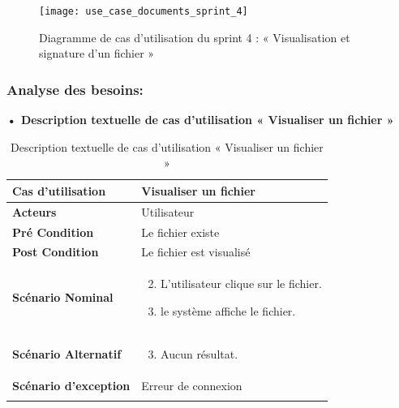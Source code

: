 \begin{figure}[H]
  \centering
  \texttt{[image: use\_case\_documents\_sprint\_4]}
  \caption{Diagramme de cas d'utilisation du sprint 4 : « Visualisation et signature d'un fichier »}
  \label{fig:UseCaseDiagram4}
\end{figure}
\subsubsection{Analyse des besoins:}
\textbf{•	Description textuelle de cas d'utilisation « Visualiser un fichier  »}
\begin{longtable}{|p{5cm}|p{10cm}|}
\hline
\textbf{Cas d'utilisation}&Visualiser un fichier\\
\hline
\textbf{Acteurs}&Utilisateur\\
\hline
\textbf{Pré Condition}&Le fichier existe\\
\hline
\textbf{Post Condition}&Le fichier est visualisé\\
\hline
\textbf{Scénario Nominal}&
\vspace{-\baselineskip}
\begin{enumerate}
    \setcounter{enumi}{1}
  \item L'utilisateur clique sur le fichier.
  \item le système affiche le fichier.
\end{enumerate}\\
\hline
\textbf{Scénario Alternatif}&
\vspace{-\baselineskip}
\begin{enumerate}
    \setcounter{enumi}{2}
    \item Aucun résultat.
\end{enumerate}\\
\hline
\textbf{Scénario d'exception}&Erreur de connexion\\
\hline
\caption{Description textuelle de cas d'utilisation « Visualiser un fichier  »}
\label{tab:description-textuelle-de-cas-d-utilisation-visualiser-un-fichier}

\end{longtable}

